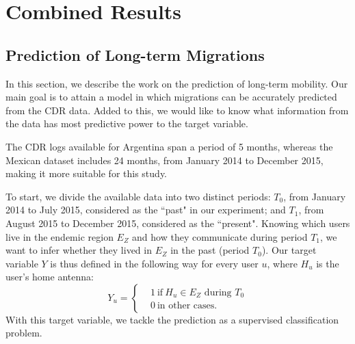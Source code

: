 
\chapter{Combined Results}\label{cha:evaluation-results}




\section{Prediction of Long-term Migrations} \label{long_term}

In this section, we describe the work on the prediction of long-term mobility. Our main goal is to attain a model in which migrations can be accurately predicted from the CDR data. Added to this, we would like to know what information from the data has most predictive power to the target variable.

The CDR logs available for Argentina span a period of 5 months, 
whereas the Mexican dataset includes 24 months, from January 2014 to December 2015, making it more suitable for this study.

To start, we divide the available data into two distinct periods:
$T_0$, from January 2014 to July 2015, considered as the ``past" in our experiment;
and $T_1$, from August 2015 to December 2015, considered as the ``present".
Knowing which users live in the endemic region $E_Z$ and how they communicate
during period $T_1$,
we want to infer whether they lived in $E_Z$ in the past (period $T_0$).
Our target variable $Y$ is thus defined in the following way for every user $u$,
where $H_u$ is the user's home antenna: 
\[
Y_u =
\begin{cases}
&1 \ \mbox{if} \ H_u \in E_Z \mbox{ during } T_0 \\
&0 \ \mbox{in other cases}.
\end{cases}
\]
With this target variable, we tackle the prediction as a supervised classification problem.


